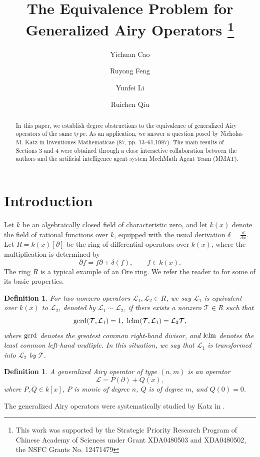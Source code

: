 \documentclass{article}
\title{The Equivalence Problem for Generalized Airy Operators
\thanks{This work was supported by the Strategic Priority Research Program of Chinese Academy of Sciences under Grant XDA0480503 and XDA0480502, 
the NSFC Grants No. 12471479}}
\author[1,2]{Yichuan Cao}
\author[1,2]{Ruyong Feng}
\author[1,2]{Yunfei Li}
\author[2]{Ruichen Qiu}
\affil[1]{State Key Laboratory of Mathematical Sciences,
Academy of Mathematics and Systems Science, Chinese Academy of Sciences}
\affil[2]{
School of Mathematics, University of Chinese Academy of Sciences}
\date{}
\newtheorem{definition}[theorem]{Definition}
\newcommand{\lclm}{{\rm lclm}}
\newcommand{\gcrd}{{\rm gcrd}}
\newcommand{\calL}{{\mathcal{L}}}
\newcommand{\calT}{{\mathcal{T}}}
\begin{document}
\maketitle

\begin{abstract}
In this paper, we establish degree obstructions to the equivalence of generalized Airy operators of the same type. As an application, we answer a question posed by Nicholas M. Katz in Inventiones Mathematicae (87, pp. 13–61,1987). The main results of Sections 3 and 4 were obtained through a close interactive collaboration between the authors and the artificial intelligence agent system MechMath Agent Team (MMAT).
\end{abstract}

\section{Introduction}
Let $k$ be an algebraically closed field of characteristic zero, and let $k(x)$ denote the field of rational functions over $k$, equipped with the usual derivation
$
\delta=\frac{d}{dx}.
$
Let
$
R=k(x)[\partial]
$
be the ring of differential operators over $k(x)$, where the multiplication is determined by
\[
\partial f=f\partial+\delta(f), \qquad f\in k(x).
\]
The ring $R$ is a typical example of an Ore ring. We refer the reader to \cite{Ore:theoryofnoncommutativepolynomials} for some of its basic properties.
\begin{definition}
For two nonzero operators $\calL_1,\calL_2\in R$, we say $\calL_1$ is equivalent over $k(x)$ to $\calL_2$, 
denoted by $\calL_1\sim \calL_2$, if there exists a nonzero $\calT \in R$ such that 
\begin{equation}
  \label{EQ:equivalence}
   \gcrd(\calT,\calL_1)=1,\,\, \lclm(\calT, \calL_1)=\calL_2\calT,
\end{equation} 
where $\gcrd$ denotes the greatest common right-hand divisor, and $\lclm$ denotes the least common left-hand multiple.
In this situation, we say that $\calL_1$ is transformed into $\calL_2$ by $\calT$.
\end{definition}
\begin{definition}\label{def:airy_operator}
A generalized Airy operator of type \((n,m)\) is an operator
\[
  \calL=P(\partial)+Q(x),
\]
where \(P,Q\in k[x]\), \(P\) is monic of degree \(n\), \(Q\) is of degree \(m\), and \(Q(0)=0\).
\end{definition}
The generalized Airy operators were systematically studied by Katz in 
\cite{Katz:calculationofdifferentialGaloisgroups,Katz:ExponentialSumsAndDifferentialEquations}. 
\end{document}
